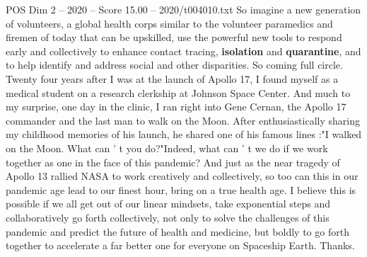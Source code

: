 \begin{textsample}{POS Dim 2 – 2020 – Score 15.00 – 2020/t004010.txt}
So imagine a new generation of volunteers, a global health corps similar to the volunteer paramedics and firemen of today that can be upskilled, use the powerful new tools to respond early and collectively to enhance contact tracing, \textbf{isolation} and \textbf{quarantine}, and to help identify and address social and other disparities.
So coming full circle.
Twenty four years after I was at the launch of Apollo 17, I found myself as a medical student on a research clerkship at Johnson Space Center.
And much to my surprise, one day in the clinic, I ran right into Gene Cernan, the Apollo 17 commander and the last man to walk on the Moon.
After enthusiastically sharing my childhood memories of his launch, he shared one of his famous lines :"I walked on the Moon.
What can ' t you do?"Indeed, what can ' t we do if we work together as one in the face of this pandemic?
And just as the near tragedy of Apollo 13 rallied NASA to work creatively and collectively, so too can this in our pandemic age lead to our finest hour, bring on a true health age.
I believe this is possible if we all get out of our linear mindsets, take exponential steps and collaboratively go forth collectively, not only to solve the challenges of this pandemic and predict the future of health and medicine, but boldly to go forth together to accelerate a far better one for everyone on Spaceship Earth.
Thanks.

\end{textsample}
